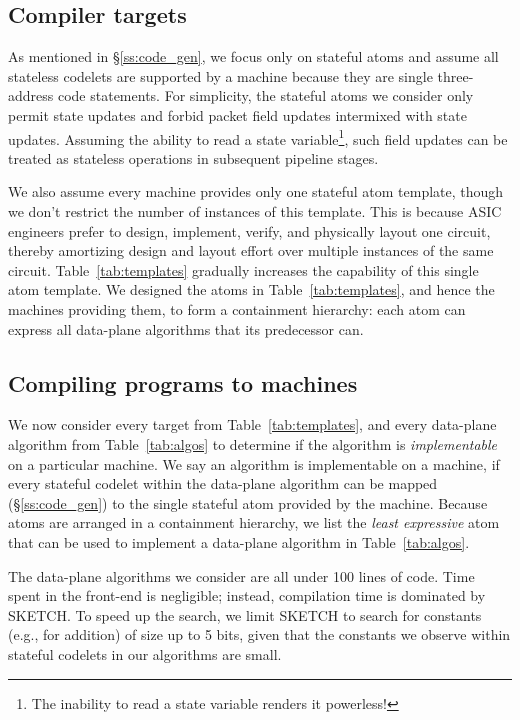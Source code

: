 \subsection{Compiler targets}
As mentioned in \S\ref{ss:code_gen}, we focus only on stateful atoms and assume
all stateless codelets are supported by a \absmachine machine because they are
single three-address code statements. For simplicity, the stateful atoms we
consider only permit state updates and forbid packet field updates intermixed
with state updates.  Assuming the ability to read a state variable\footnote{The
inability to read a state variable renders it powerless!}, such field updates
can be treated as stateless operations in subsequent pipeline stages.

We also assume every \absmachine machine provides only one stateful atom
template, though we don't restrict the number of instances of this template.
This is because ASIC engineers prefer to design, implement, verify, and
physically layout one circuit, thereby amortizing design and layout effort over
multiple instances of the same circuit.  Table~\ref{tab:templates} gradually
increases the capability of this single atom template.  We designed the atoms
in Table~\ref{tab:templates}, and hence the \absmachine machines providing
them, to form a containment hierarchy: each atom can express all data-plane
algorithms that its predecessor can.

\subsection{Compiling \pktlanguage programs to \absmachine machines}
We now consider every target from Table~\ref{tab:templates}, and every
data-plane algorithm from Table~\ref{tab:algos} to determine if the algorithm
is \textit{implementable} on a particular \absmachine machine. We say an
algorithm is implementable on a \absmachine machine, if every stateful codelet
within the data-plane algorithm can be mapped (\S\ref{ss:code_gen}) to the
single stateful atom provided by the \absmachine machine. Because atoms are
arranged in a containment hierarchy, we list the \textit{least expressive} atom
that can be used to implement a data-plane algorithm in Table~\ref{tab:algos}.

The data-plane algorithms we consider are all under 100 lines of code.  Time
spent in the front-end is negligible; instead, compilation time is dominated by
SKETCH. To speed up the search, we limit SKETCH to search for constants (e.g.,
for addition) of size up to 5 bits, given that the constants we observe within
stateful codelets in our algorithms are small.

